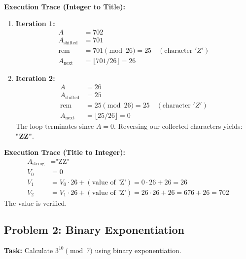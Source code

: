 \documentclass[10pt,journal,compsoc,onecolumn]{IEEEtran}
\begin{document}
\textbf{Execution Trace (Integer to Title):}
\begin{enumerate}
    \item \textbf{Iteration 1:}
    \begin{align}
    A &= 702 \\
    A_{\text{shifted}} &= 701 \\
    \text{rem} &= 701 \pmod{26} = 25 \quad (\text{character } 'Z') \\
    A_{\text{next}} &= \lfloor 701 / 26 \rfloor = 26
    \end{align}
    \item \textbf{Iteration 2:}
    \begin{align}
    A &= 26 \\
    A_{\text{shifted}} &= 25 \\
    \text{rem} &= 25 \pmod{26} = 25 \quad (\text{character } 'Z') \\
    A_{\text{next}} &= \lfloor 25 / 26 \rfloor = 0
    \end{align}
    The loop terminates since $A = 0$. Reversing our collected characters yields: \textbf{"ZZ"}.
\end{enumerate}

\textbf{Execution Trace (Title to Integer):}
\begin{align}
A_{\text{string}} &= \text{"ZZ"} \\
V_0 &= 0 \\
V_1 &= V_0 \cdot 26 + (\text{value of 'Z'}) = 0 \cdot 26 + 26 = 26 \\
V_2 &= V_1 \cdot 26 + (\text{value of 'Z'}) = 26 \cdot 26 + 26 = 676 + 26 = 702
\end{align}
The value is verified.

\subsection{Problem 2: Binary Exponentiation}
\textbf{Task:} Calculate $3^{10} \pmod 7$ using binary exponentiation.
\end{document}
